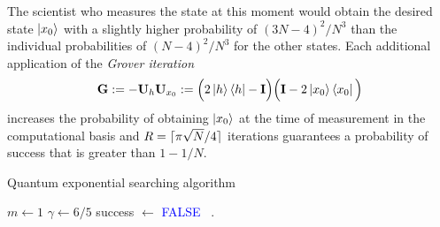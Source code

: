 \documentclass[12pt]{article} %
\DeclarePairedDelimiter{\ceil}{\lceil}{\rceil}
\begin{document}
The scientist who measures the state at this moment would obtain the desired state $\ket{x_0}$ with a slightly higher probability of $(3N-4)^2/N^3$  than the individual probabilities of $(N-4)^2/N^3$ for the other states. Each additional application of the \emph{Grover iteration}
\begin{align}\label{eq:grov}
\mathbf{G} := - \mathbf{U}_h \mathbf{U}_{x_0} := \Big(2\ket{h}\bra{h}-\mathbf{I} \Big) \Big( \mathbf{I} - 2 \ket{x_0}\bra{x_0} \Big)
\end{align}
increases the probability of obtaining $\ket{x_0}$ at the time of measurement in the computational basis and $R=\ceil{\pi\sqrt{N}/4}$ iterations guarantees a probability of success that is greater than $1-1/N$.

  \begin{algorithm}[th!]
	\caption{Quantum exponential searching algorithm \citep{boyer1998tight}}\label{alg:expoSearch}
	$m \gets 1$\;
	$\gamma \gets 6/5$\;
	success $\gets$ \textcolor{blue}{FALSE}\;
	\ .
	
	\vspace{0.5em}
\end{algorithm}
\end{document}
